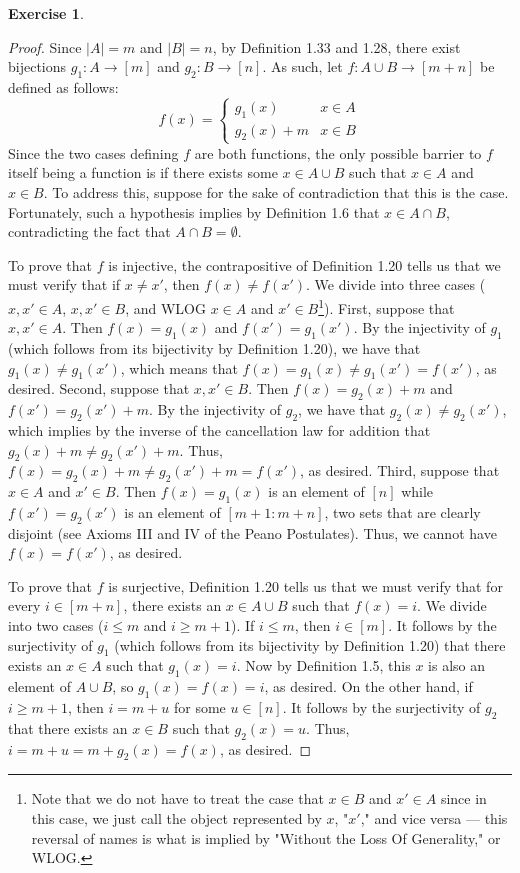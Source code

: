 \documentclass[titlepage]{article}
\newcounter{script}
\theoremstyle{definition}
\newtheorem{exercise}{Exercise}[script]
\begin{document}
\begin{exercise}
\begin{enumerate}[label={\alph*)}]
\begin{proof}
            Since $|A|=m$ and $|B|=n$, by Definition 1.33 and 1.28, there exist bijections $g_1:A\to[m]$ and $g_2:B\to[n]$. As such, let $f:A\cup B\to[m+n]$ be defined as follows:
            \begin{equation*}
                f(x) =
                \begin{cases}
                    g_1(x) & x\in A\\
                    g_2(x)+m & x\in B
                \end{cases}
            \end{equation*}
            Since the two cases defining $f$ are both functions, the only possible barrier to $f$ itself being a function is if there exists some $x\in A\cup B$ such that $x\in A$ and $x\in B$. To address this, suppose for the sake of contradiction that this is the case. Fortunately, such a hypothesis implies by Definition 1.6 that $x\in A\cap B$, contradicting the fact that $A\cap B=\emptyset$.\par
            To prove that $f$ is injective, the contrapositive of Definition 1.20 tells us that we must verify that if $x\neq x'$, then $f(x)\neq f(x')$. We divide into three cases ($x,x'\in A$, $x,x'\in B$, and WLOG $x\in A$ and $x'\in B$\footnote{Note that we do not have to treat the case that $x\in B$ and $x'\in A$ since in this case, we just call the object represented by $x$, "$x'$," and vice versa --- this reversal of names is what is implied by "Without the Loss Of Generality," or WLOG.}). First, suppose that $x,x'\in A$. Then $f(x)=g_1(x)$ and $f(x')=g_1(x')$. By the injectivity of $g_1$ (which follows from its bijectivity by Definition 1.20), we have that $g_1(x)\neq g_1(x')$, which means that $f(x)=g_1(x)\neq g_1(x')=f(x')$, as desired. Second, suppose that $x,x'\in B$. Then $f(x)=g_2(x)+m$ and $f(x')=g_2(x')+m$. By the injectivity of $g_2$, we have that $g_2(x)\neq g_2(x')$, which implies by the inverse of the cancellation law for addition that $g_2(x)+m\neq g_2(x')+m$. Thus, $f(x)=g_2(x)+m\neq g_2(x')+m=f(x')$, as desired. Third, suppose that $x\in A$ and $x'\in B$. Then $f(x)=g_1(x)$ is an element of $[n]$ while $f(x')=g_2(x')$ is an element of $[m+1:m+n]$, two sets that are clearly disjoint (see Axioms III and IV of the Peano Postulates). Thus, we cannot have $f(x)=f(x')$, as desired.\par
            To prove that $f$ is surjective, Definition 1.20 tells us that we must verify that for every $i\in[m+n]$, there exists an $x\in A\cup B$ such that $f(x)=i$. We divide into two cases ($i\leq m$ and $i\geq m+1$). If $i\leq m$, then $i\in[m]$. It follows by the surjectivity of $g_1$ (which follows from its bijectivity by Definition 1.20) that there exists an $x\in A$ such that $g_1(x)=i$. Now by Definition 1.5, this $x$ is also an element of $A\cup B$, so $g_1(x)=f(x)=i$, as desired. On the other hand, if $i\geq m+1$, then $i=m+u$ for some $u\in[n]$. It follows by the surjectivity of $g_2$ that there exists an $x\in B$ such that $g_2(x)=u$. Thus, $i=m+u=m+g_2(x)=f(x)$, as desired.\par

\end{proof}
\end{enumerate}
\end{exercise}
\end{document}
